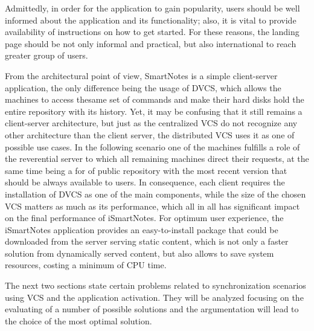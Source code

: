 Admittedly, in order for the application to gain popularity, users should be well informed about the application and its functionality; also, it is vital to provide availability of instructions on how to get started. For these reasons, the landing page should be not only informal and practical, but also international to reach greater group of users.

From the architectural point of view, SmartNotes is a simple client-server application, the only difference being the usage of DVCS, which allows the machines to access thesame set of commands and make their hard disks hold the entire repository with its history. Yet, it may be confusing that it still remains a client-server architecture, but just as the centralized VCS do not recognize any other architecture than the client server, the distributed VCS uses it as one of possible use cases. In the following scenario one of the machines fulfills a role of the reverential server to which all remaining machines direct their requests, at the same time being a for of public repository with the most recent version that should be always available to users. In consequence, each client requires the installation of DVCS as one of the main components, while the size of the chosen VCS matters as much as its performance, which all in all has significant impact on the final performance of iSmartNotes. For optimum user experience, the iSmartNotes application provides an easy-to-install package that could be downloaded from the server serving static content, which is not only a faster solution from dynamically served content, but also allows to save system resources, costing a minimum of CPU time.

The next two sections state certain problems related to synchronization scenarios using VCS and the application activation. They will be analyzed focusing on the evaluating of a number of possible solutions and the argumentation will lead to the choice of the most optimal solution.  
 
